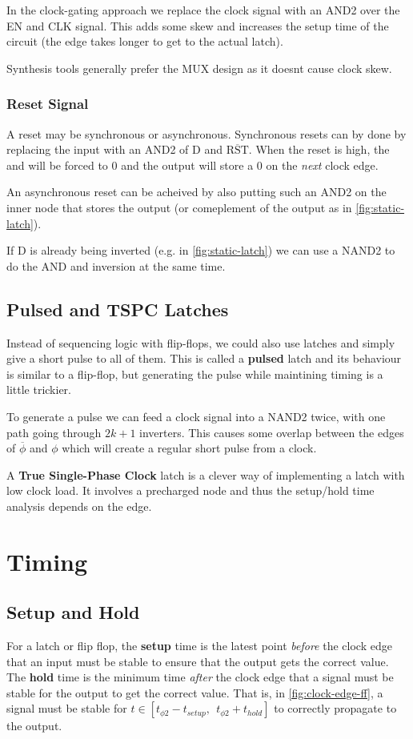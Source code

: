 \documentclass[11pt]{report}
\begin{document}
In the clock-gating approach we replace the clock signal with an AND2 over the EN and CLK signal. This adds some skew and increases the setup time of the circuit (the edge takes longer to get to the actual latch).

Synthesis tools generally prefer the MUX design as it doesnt cause clock skew.

\subsubsection{Reset Signal}
A reset may be synchronous or asynchronous. Synchronous resets can by done by replacing the input with an AND2 of D and $\overline{\text{RST}}$. When the reset is high, the and will be forced to 0 and the output will store a 0 on the \textit{next} clock edge.

An asynchronous reset can be acheived by also putting such an AND2 on the inner node that stores the output (or comeplement of the output as in \autoref{fig:static-latch}).

If D is already being inverted (e.g. in \autoref{fig:static-latch}) we can use a NAND2 to do the AND and inversion at the same time.

\subsection{Pulsed and TSPC Latches}

Instead of sequencing logic with flip-flops, we could also use latches and simply give a short pulse to all of them. This is called a \textbf{pulsed} latch and its behaviour is similar to a flip-flop, but generating the pulse while maintining timing is a little trickier.

To generate a pulse we can feed a clock signal into a NAND2 twice, with one path going through $2k+1$ inverters. This causes some overlap between the edges of $\overline{\phi}$ and $\phi$ which will create a regular short pulse from a clock.

A \textbf{True Single-Phase Clock} latch is a clever way of implementing a latch with low clock load. It involves a precharged node and thus the setup/hold time analysis depends on the edge.

\section{Timing}

\subsection{Setup and Hold}\label{sec:setup-hold}
For a latch or flip flop, the \textbf{setup} time is the latest point \textit{before} the clock edge that an input must be stable to ensure that the output gets the correct value. The \textbf{hold} time is the minimum time \textit{after} the clock edge that a signal must be stable for the output to get the correct value. That is, in \autoref{fig:clock-edge-ff}, a signal must be stable for $t \in [t_{\phi2} - t_{setup},\ \ t_{\phi2} + t_{hold}]$ to correctly propagate to the output.
\end{document}
